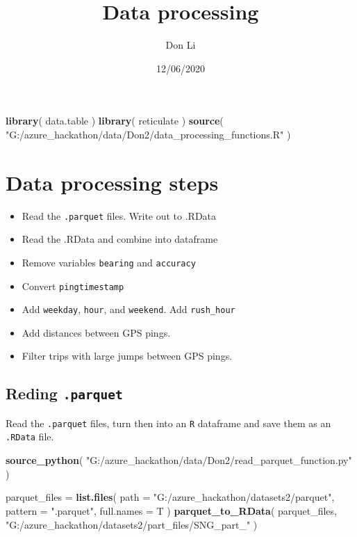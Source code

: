 \documentclass[]{article}
\title{Data processing}
\author{Don Li}
\date{12/06/2020}
\newenvironment{Shaded}{\begin{snugshade}}{\end{snugshade}}
\newcommand{\DataTypeTok}[1]{\textcolor[rgb]{0.13,0.29,0.53}{#1}}
\newcommand{\KeywordTok}[1]{\textcolor[rgb]{0.13,0.29,0.53}{\textbf{#1}}}
\newcommand{\NormalTok}[1]{#1}
\newcommand{\StringTok}[1]{\textcolor[rgb]{0.31,0.60,0.02}{#1}}
\begin{document}
\maketitle

\begin{Shaded}
\begin{Highlighting}[]
\KeywordTok{library}\NormalTok{( data.table )}
\KeywordTok{library}\NormalTok{( reticulate )}
\KeywordTok{source}\NormalTok{( }\StringTok{"G:/azure_hackathon/data/Don2/data_processing_functions.R"}\NormalTok{ )}
\end{Highlighting}
\end{Shaded}

\hypertarget{data-processing-steps}{%
\section{Data processing steps}\label{data-processing-steps}}

\begin{itemize}
\item
  Read the \texttt{.parquet} files. Write out to .RData
\item
  Read the .RData and combine into dataframe
\item
  Remove variables \texttt{bearing} and \texttt{accuracy}
\item
  Convert \texttt{pingtimestamp}
\item
  Add \texttt{weekday}, \texttt{hour}, and \texttt{weekend}. Add
  \texttt{rush\_hour}
\item
  Add distances between GPS pings.
\item
  Filter trips with large jumps between GPS pings.
\end{itemize}

\hypertarget{reding-.parquet}{%
\subsection{\texorpdfstring{Reding
\texttt{.parquet}}{Reding .parquet}}\label{reding-.parquet}}

Read the \texttt{.parquet} files, turn then into an \texttt{R} dataframe
and save them as an \texttt{.RData} file.

\begin{Shaded}
\begin{Highlighting}[]
\KeywordTok{source_python}\NormalTok{( }\StringTok{"G:/azure_hackathon/data/Don2/read_parquet_function.py"}\NormalTok{ )}

\NormalTok{parquet_files =}\StringTok{ }\KeywordTok{list.files}\NormalTok{( }\DataTypeTok{path =} \StringTok{"G:/azure_hackathon/datasets2/parquet"}\NormalTok{,}
    \DataTypeTok{pattern =} \StringTok{".parquet"}\NormalTok{, }\DataTypeTok{full.names =}\NormalTok{ T )}
\KeywordTok{parquet_to_RData}\NormalTok{( parquet_files, }
    \StringTok{"G:/azure_hackathon/datasets2/part_files/SNG_part_"}\NormalTok{ )}
\end{Highlighting}
\end{Shaded}
\end{document}
